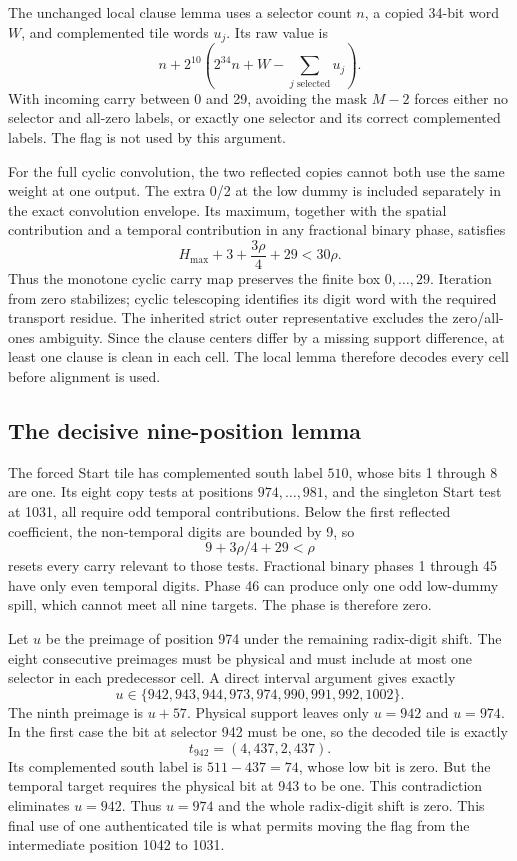 \documentclass[10pt,letterpaper]{article}
\theoremstyle{remark}\newtheorem{remark}[theorem]{Remark}
\begin{document}
The unchanged local clause lemma uses a selector count $n$, a copied
34-bit word $W$, and complemented tile words $u_j$. Its raw value is
\[
 n+2^{10}\left(2^{34}n+W-\sum_{j\text{ selected}}u_j\right).
\]
With incoming carry between 0 and 29, avoiding the mask $M-2$ forces either
no selector and all-zero labels, or exactly one selector and its correct
complemented labels. The flag is not used by this argument.

For the full cyclic convolution, the two reflected copies cannot both use
the same weight at one output. The extra 0/2 at the low dummy is included
separately in the exact convolution envelope. Its maximum, together with
the spatial contribution and a temporal contribution in any fractional
binary phase, satisfies
\[
 H_{\max}+3+\frac{3\rho}{4}+29<30\rho.
\]
Thus the monotone cyclic carry map preserves the finite box $0,\ldots,29$.
Iteration from zero stabilizes; cyclic telescoping identifies its digit
word with the required transport residue. The inherited strict outer
representative excludes the zero/all-ones ambiguity. Since the clause
centers differ by a missing support difference, at least one clause is
clean in each cell. The local lemma therefore decodes every cell before
alignment is used.

\subsection{The decisive nine-position lemma}

The forced Start tile has complemented south label $510$, whose bits
1 through 8 are one. Its eight copy tests at positions
$974,\ldots,981$, and the singleton Start test at 1031, all require odd
temporal contributions. Below the first reflected coefficient, the
non-temporal digits are bounded by 9, so
\[
 9+3\rho/4+29<\rho
\]
resets every carry relevant to those tests. Fractional binary phases
1 through 45 have only even temporal digits. Phase 46 can produce only
one odd low-dummy spill, which cannot meet all nine targets. The phase
is therefore zero.

Let $u$ be the preimage of position 974 under the remaining radix-digit
shift. The eight consecutive preimages must be physical and must include
at most one selector in each predecessor cell. A direct interval argument
gives exactly
\[
 u\in\{942,943,944,973,974,990,991,992,1002\}.
\]
The ninth preimage is $u+57$. Physical support leaves only $u=942$ and
$u=974$. In the first case the bit at selector 942 must be one, so the
decoded tile is exactly
\[
 t_{942}=(4,437,2,437).
\]
Its complemented south label is $511-437=74$, whose low bit is zero.
But the temporal target requires the physical bit at 943 to be one.
This contradiction eliminates $u=942$. Thus $u=974$ and the whole
radix-digit shift is zero. This final use of one authenticated tile is
what permits moving the flag from the intermediate position 1042 to 1031.
\end{document}
